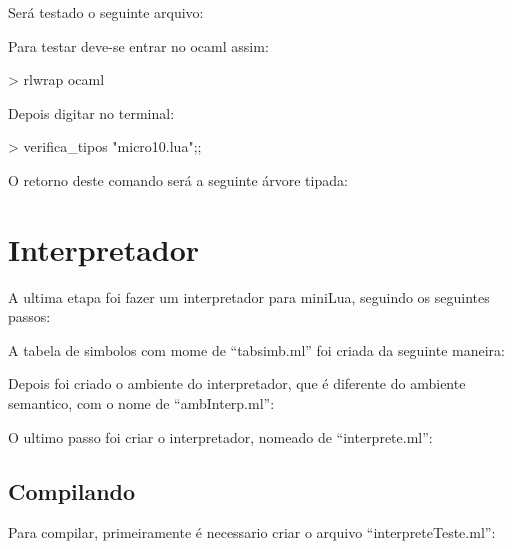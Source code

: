 \documentclass[12pt,a4paper]{report}
\begin{document}
Será testado o seguinte arquivo:




Para testar deve-se entrar no ocaml assim:

\begin{terminal}
> rlwrap ocaml
\end{terminal}

Depois digitar no terminal:

\begin{terminal}
> verifica_tipos "micro10.lua";;
\end{terminal}

O retorno deste comando será a seguinte árvore tipada:




\section{Interpretador}

A ultima etapa foi fazer um interpretador para miniLua, seguindo os seguintes passos:

A tabela de simbolos com mome de ``tabsimb.ml'' foi criada da seguinte maneira:



Depois foi criado o ambiente do interpretador, que é diferente do ambiente semantico, com o nome de ``ambInterp.ml'':



O ultimo passo foi criar o interpretador, nomeado de ``interprete.ml'':





\subsection{Compilando}

Para compilar, primeiramente é necessario criar o arquivo ``interpreteTeste.ml'':


\end{document}
